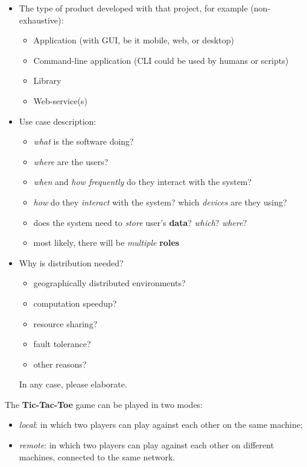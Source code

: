 \documentclass{scrartcl}
\begin{document}
\begin{itemize}
  \item The type of product developed with that project, for example (non-exhaustive):
  \begin{itemize}
    \item Application (with GUI, be it mobile, web, or desktop)
    \item Command-line application (CLI could be used by humans or scripts)
    \item Library
    \item Web-service(s)
  \end{itemize}

  \item Use case description:
  \begin{itemize}
    \item \emph{what} is the software doing?
    \item \emph{where} are the users?
    \item \emph{when} and \emph{how frequently} do they interact with the system?
    \item \emph{how} do they \emph{interact} with the system? which \emph{devices} are they using?
    \item does the system need to \emph{store} user's \textbf{data}? \emph{which}? \emph{where}?
    \item most likely, there will be \emph{multiple} \textbf{roles}
  \end{itemize}

  \item Why is distribution needed?
  \begin{itemize}
    \item geographically distributed environments?
    \item computation speedup?
    \item resource sharing?
    \item fault tolerance?
    \item other reasons?
  \end{itemize}
  In any case, please elaborate.
\end{itemize}

The \textbf{Tic-Tac-Toe} game can be played in two modes:
\begin{itemize}
  \item \textit{local}: in which two players can play against each other on the same machine;
  \item \textit{remote}: in which two players can play against each other on different machines,
  connected to the same network.
\end{itemize}
\end{document}
